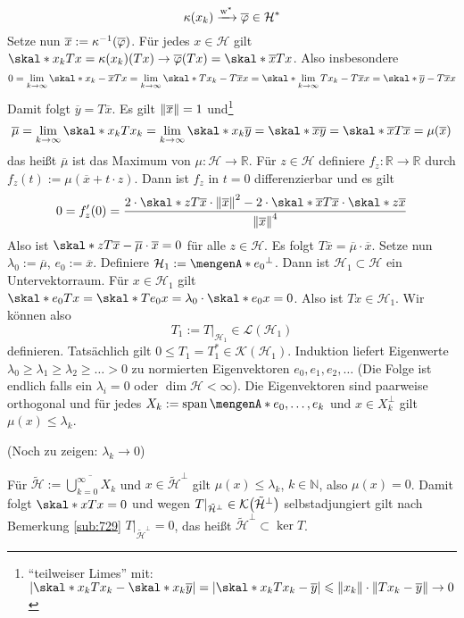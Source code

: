 \[
	\kappa(x_k) \xrightarrow{\w^*} \overline{\varphi} \in \mathcal{H}^*
\]
Setze nun $\overline{x} := \kappa ^{-1}\enbrace*{\overline{\varphi}}$. Für jedes $x \in \mathcal{H}$ gilt  
$\skal*{x_k}{T x} = \kappa(x_k)(T x) \to \overline{\varphi}(T x) = \skal*{\overline{x}}{T x}$. Also insbesondere
\[
	0 = \lim_{k\to \infty} \skal*{x_k -\overline{x}}{T x} = \lim_{ k \to \infty} \skal*{T x_k - T \overline{x}}{x}= \skal*{\lim_{ k \to \infty} T x_k - T \overline{x} }{x}
	= \skal*{\overline{y} - T \overline{x}}{x}
\]
Damit folgt $\overline{y}=T \overline{x}$. Es gilt $\norm{\overline{x}}=1$ und\footnote{\enquote{teilweiser Limes} mit: 
$\abs*{\skal*{x_k}{T x_k} - \skal*{x_k}{\overline{y}}}=\abs*{\skal*{x_k}{T x_k - \overline{y}}} \le \norm{x_k} \cdot \norm{T x_k - \overline{y}} \to 0$}
\[
	\overline{\mu} = \lim_{ k \to \infty} \skal*{x_k}{T x_k} = \lim_{ k \to \infty}  \skal*{x_k}{\overline{y}} = \skal*{\overline{x}}{\overline{y}} = 
	\skal*{\overline{x}}{T \overline{x}} = \mu(\overline{x})
\]
das heißt $\overline{\mu}$ ist das Maximum von $\mu \colon \mathcal{H} \to \mathds{R}$. Für $z \in \mathcal{H}$ definiere $f_z \colon \mathds{R} \to \mathds{R}$ durch
$f_z(t) := \mu(\overline{x}+ t \cdot z)$. Dann ist $f_z$ in $t=0$ differenzierbar und es gilt
\[
	0 = f_z'(0) = \frac{2 \cdot \skal*{z}{T \overline{x}} \cdot \norm{\overline{x}}^2 - 2 \cdot \skal*{\overline{x}}{T \overline{x}} \cdot 
	\skal*{z}{\overline{x}}}{\norm{\overline{x}}^4} 
\]
Also ist $\skal*{z}{T \overline{x} - \overline{\mu} \cdot \overline{x}} =0$ für alle $z \in \mathcal{H}$. Es folgt $T \overline{x}= \overline{\mu} \cdot \overline{x}$.
Setze nun $\lambda_0 := \overline{\mu}$, $e_0:= \overline{x}$. Definiere $\mathcal{H}_1 := \set{e_0}^\bot$. Dann ist $\mathcal{H}_1 \subset \mathcal{H}$ ein Untervektorraum.
Für $x \in \mathcal{H}_1$ gilt $\skal*{e_0}{Tx} = \skal*{T e_0}{x}= \lambda_0 \cdot \skal*{e_0}{x}=0$. Also ist $Tx \in \mathcal{H}_1$. Wir können also 
\[
	T_1 := T\big|_{\mathcal{H}_1} \in \mathcal{L}(\mathcal{H}_1)
\]
definieren. Tatsächlich gilt $0 \le T_1 = T_1^* \in \mathcal{K}(\mathcal{H}_1)$. Induktion liefert Eigenwerte $\lambda_0 \ge \lambda_1 \ge \lambda_2 \ge \ldots>0$ zu
normierten Eigenvektoren $e_0, e_1, e_2, \ldots$ (Die Folge ist endlich falls ein $\lambda_i=0$ oder $\dim \mathcal{H} < \infty$). Die Eigenvektoren sind paarweise orthogonal
und für jedes $X_k := \Span \set{e_0, \ldots ,e_k}$ und $x \in X_k^\bot$ gilt $\mu(x) \le \lambda_k$.

(Noch zu zeigen: $\lambda_k \to 0$)

Für $\tilde{\mathcal{H}} := \overline{\bigcup_{k=0}^\infty X_k}$ und $x \in \tilde{\mathcal{H}}^\bot$ gilt $\mu(x) \le \lambda_k$, $k \in \mathds{N}$, also $\mu(x)=0$.
Damit folgt $\skal*{x}{T x}=0$ und wegen $T|_{\tilde{\mathcal{H}}^\bot} \in \mathcal{K} \enbrace[\big]{\tilde{\mathcal{H}}^\bot}$ selbstadjungiert gilt nach Bemerkung 
\ref{sub:729} $T|_{\tilde{\mathcal{H}}^\bot} =0$, das heißt $\tilde{\mathcal{H}}^\bot \subset \ker T$.

